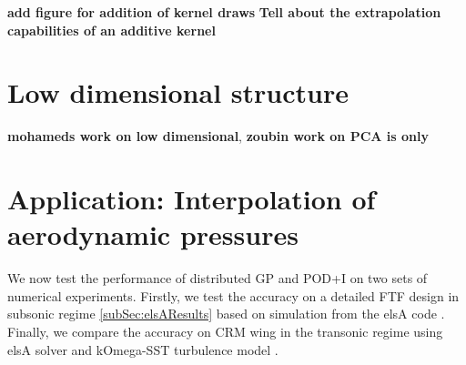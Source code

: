 \textbf{add figure for addition of kernel draws}
\textbf{Tell about the extrapolation capabilities of an additive kernel}

\begin{figure}[!ht]
  \centering
    \quad
{}\quad

       \caption{}
       \label{figPrior}
\end{figure}

\section{Low dimensional structure}

\textbf{mohameds work on low dimensional}, \textbf{zoubin work on PCA is only }




\section{Application: Interpolation of aerodynamic pressures}

We now test the performance of distributed GP and POD+I on two sets of numerical experiments. Firstly, we test the accuracy on a detailed FTF design \cite{Bosco2016} in subsonic regime \ref{subSec:elsAResults} based on simulation from the elsA code \cite{cambier2008status}. Finally, we compare the accuracy on CRM wing in the transonic regime using elsA solver and kOmega-SST turbulence model \cite{vassberg2014summary}. 

